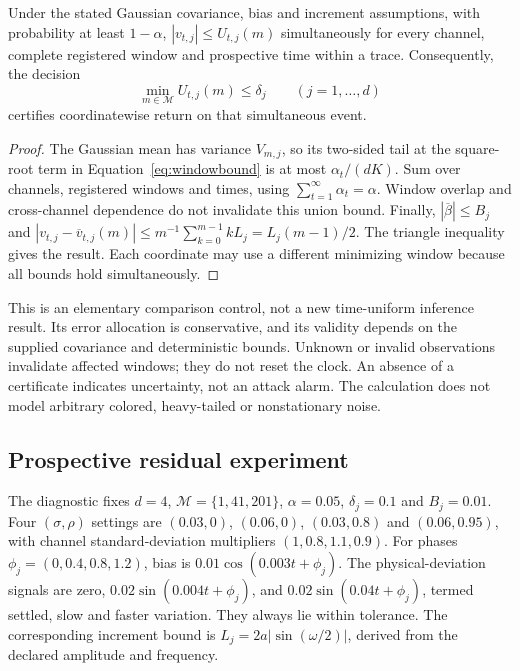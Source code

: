\begin{proposition}
Under the stated Gaussian covariance, bias and increment assumptions, with probability at least $1-\alpha$, $|v_{t,j}|\le U_{t,j}(m)$ simultaneously for every channel, complete registered window and prospective time within a trace. Consequently, the decision
\begin{equation}
 \min_{m\in\mathcal M}U_{t,j}(m)\le\delta_j\qquad(j=1,\ldots,d)
 \label{eq:certificate}
\end{equation}
certifies coordinatewise return on that simultaneous event.
\end{proposition}
\begin{proof}
The Gaussian mean has variance $V_{m,j}$, so its two-sided tail at the square-root term in Equation~\ref{eq:windowbound} is at most $\alpha_t/(dK)$. Sum over channels, registered windows and times, using $\sum_{t=1}^{\infty}\alpha_t=\alpha$. Window overlap and cross-channel dependence do not invalidate this union bound. Finally, $|\overline\beta|\le B_j$ and
$|v_{t,j}-\overline v_{t,j}(m)|\le m^{-1}\sum_{k=0}^{m-1}kL_j=L_j(m-1)/2$.
The triangle inequality gives the result. Each coordinate may use a different minimizing window because all bounds hold simultaneously.
\end{proof}

This is an elementary comparison control, not a new time-uniform inference result. Its error allocation is conservative, and its validity depends on the supplied covariance and deterministic bounds. Unknown or invalid observations invalidate affected windows; they do not reset the clock. An absence of a certificate indicates uncertainty, not an attack alarm. The calculation does not model arbitrary colored, heavy-tailed or nonstationary noise.

\subsection{Prospective residual experiment}
The diagnostic fixes $d=4$, $\mathcal M=\{1,41,201\}$, $\alpha=0.05$, $\delta_j=0.1$ and $B_j=0.01$. Four $(\sigma,\rho)$ settings are $(0.03,0)$, $(0.06,0)$, $(0.03,0.8)$ and $(0.06,0.95)$, with channel standard-deviation multipliers $(1,0.8,1.1,0.9)$. For phases $\phi_j=(0,0.4,0.8,1.2)$, bias is $0.01\cos(0.003t+\phi_j)$. The physical-deviation signals are zero, $0.02\sin(0.004t+\phi_j)$, and $0.02\sin(0.04t+\phi_j)$, termed settled, slow and faster variation. They always lie within tolerance. The corresponding increment bound is $L_j=2a|\sin(\omega/2)|$, derived from the declared amplitude and frequency.

